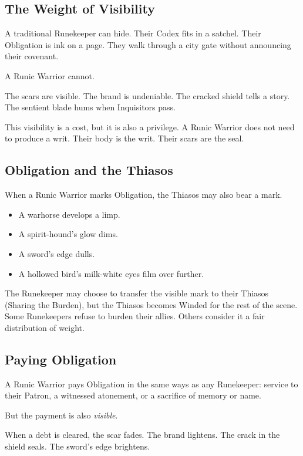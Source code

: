 \subsection{The Weight of Visibility}

A traditional Runekeeper can hide. Their Codex fits in a satchel. Their Obligation is ink on a page. They walk through a city gate without announcing their covenant.

A Runic Warrior cannot.

The scars are visible. The brand is undeniable. The cracked shield tells a story. The sentient blade hums when Inquisitors pass.

This visibility is a cost, but it is also a privilege. A Runic Warrior does not need to produce a writ. Their body is the writ. Their scars are the seal.

\subsection{Obligation and the Thiasos}

When a Runic Warrior marks Obligation, the Thiasos may also bear a mark.

\begin{itemize}
\item A warhorse develops a limp.
\item A spirit-hound's glow dims.
\item A sword's edge dulls.
\item A hollowed bird's milk-white eyes film over further.
\end{itemize}

The Runekeeper may choose to transfer the visible mark to their Thiasos (Sharing the Burden), but the Thiasos becomes Winded for the rest of the scene. Some Runekeepers refuse to burden their allies. Others consider it a fair distribution of weight.

\subsection{Paying Obligation}

A Runic Warrior pays Obligation in the same ways as any Runekeeper: service to their Patron, a witnessed atonement, or a sacrifice of memory or name.

But the payment is also \textit{visible}.

When a debt is cleared, the scar fades. The brand lightens. The crack in the shield seals. The sword's edge brightens.

